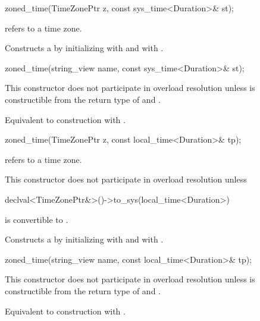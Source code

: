 \begin{itemdecl}
zoned_time(TimeZonePtr z, const sys_time<Duration>& st);
\end{itemdecl}

\begin{itemdescr}
\pnum
\requires {} refers to a time zone.

\pnum
\effects
Constructs a  by
initializing  with  and  with .
\end{itemdescr}

\begin{itemdecl}
zoned_time(string_view name, const sys_time<Duration>& st);
\end{itemdecl}

\begin{itemdescr}
\pnum
\remarks
This constructor does not participate in overload resolution unless
 is constructible from the return type of  and .

\pnum
\effects
Equivalent to construction with .
\end{itemdescr}

\begin{itemdecl}
zoned_time(TimeZonePtr z, const local_time<Duration>& tp);
\end{itemdecl}

\begin{itemdescr}
\pnum
\requires {} refers to a time zone.

\pnum
\remarks
This constructor does not participate in overload resolution unless
\begin{codeblock}
declval<TimeZonePtr&>()->to_sys(local_time<Duration>{})
\end{codeblock}
is convertible to .

\pnum
\effects
Constructs a  by
initializing  with  and  with .
\end{itemdescr}

\begin{itemdecl}
zoned_time(string_view name, const local_time<Duration>& tp);
\end{itemdecl}

\begin{itemdescr}
\pnum
\remarks
This constructor does not participate in overload resolution unless
 is constructible from the return type of  and .

\pnum
\effects
Equivalent to construction with .
\end{itemdescr}

